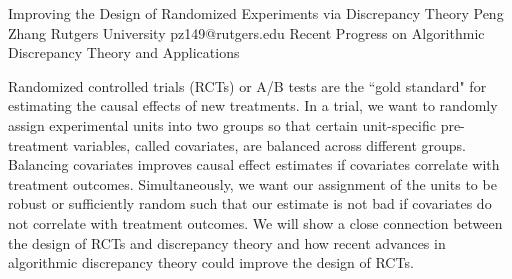 \begin{talk}
  {Improving the Design of Randomized Experiments via Discrepancy Theory}%
  {Peng Zhang}%
  {Rutgers University}%
  {pz149@rutgers.edu}%
  {}
  {Recent Progress on Algorithmic Discrepancy Theory and Applications}%
    
   
Randomized controlled trials (RCTs) or A/B tests are the ``gold standard" for estimating the causal effects of new treatments. In a trial, we want to randomly assign experimental units into two groups so that certain unit-specific pre-treatment variables, called covariates, are balanced across different groups. Balancing covariates improves causal effect estimates if covariates correlate with treatment outcomes. Simultaneously, we want our assignment of the units to be robust or sufficiently random such that our estimate is not bad if covariates do not correlate with treatment outcomes. We will show a close connection between the design of RCTs and discrepancy theory and how recent advances in algorithmic discrepancy theory could improve the design of RCTs.

\medskip


\end{talk}

